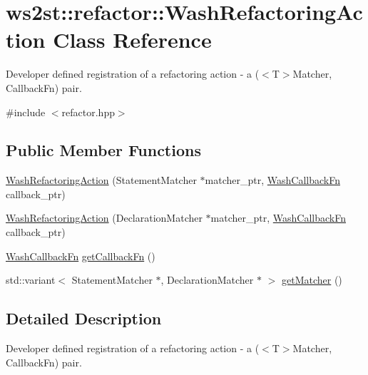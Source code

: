 \hypertarget{classws2st_1_1refactor_1_1WashRefactoringAction}{}\section{ws2st\+:\+:refactor\+:\+:Wash\+Refactoring\+Action Class Reference}
\label{classws2st_1_1refactor_1_1WashRefactoringAction}


Developer defined registration of a refactoring action -\/ a ($<$\+T$>$Matcher, Callback\+Fn) pair.  




{\ttfamily \#include $<$refactor.\+hpp$>$}

\subsection*{Public Member Functions}
\begin{DoxyCompactItemize}
\item 
\mbox{\hyperlink{classws2st_1_1refactor_1_1WashRefactoringAction_a37b89a13a8e91735717cc1df37e8eabb}{Wash\+Refactoring\+Action}} (Statement\+Matcher $\ast$matcher\+\_\+ptr, \mbox{\hyperlink{namespacews2st_a682dfda40d8282c7e579a7b826a7d861}{Wash\+Callback\+Fn}} callback\+\_\+ptr)
\item 
\mbox{\hyperlink{classws2st_1_1refactor_1_1WashRefactoringAction_a5ebcf97bf4b5fec82c4a9c931b61ae2b}{Wash\+Refactoring\+Action}} (Declaration\+Matcher $\ast$matcher\+\_\+ptr, \mbox{\hyperlink{namespacews2st_a682dfda40d8282c7e579a7b826a7d861}{Wash\+Callback\+Fn}} callback\+\_\+ptr)
\item 
\mbox{\hyperlink{namespacews2st_a682dfda40d8282c7e579a7b826a7d861}{Wash\+Callback\+Fn}} \mbox{\hyperlink{classws2st_1_1refactor_1_1WashRefactoringAction_aaf97a9edbe147cb2d5697d28c5485924}{get\+Callback\+Fn}} ()
\item 
std\+::variant$<$ Statement\+Matcher $\ast$, Declaration\+Matcher $\ast$ $>$ \mbox{\hyperlink{classws2st_1_1refactor_1_1WashRefactoringAction_a22a440b7927da3ab1561a9292b9ee0d6}{get\+Matcher}} ()
\end{DoxyCompactItemize}


\subsection{Detailed Description}
Developer defined registration of a refactoring action -\/ a ($<$\+T$>$Matcher, Callback\+Fn) pair. 

